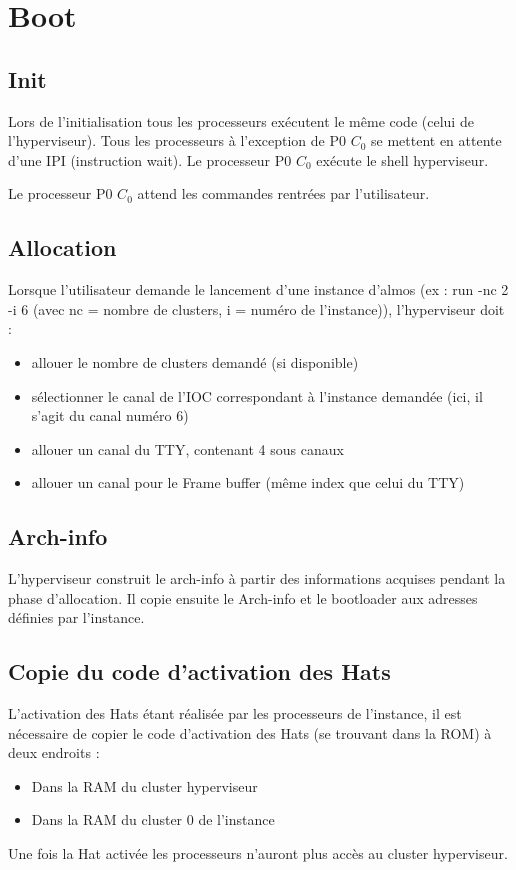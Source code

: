 \documentclass[8pt]{article}
\begin{document}
\section*{Boot}
\subsection*{Init}
Lors de l'initialisation tous les processeurs exécutent le même code (celui de l'hyperviseur). Tous les processeurs à l'exception de P0 $C_0$ se mettent en attente d'une IPI (instruction wait). Le processeur P0 $C_0$ exécute le shell hyperviseur.

Le processeur P0 $C_0$ attend les commandes rentrées par l'utilisateur.

\subsection*{Allocation}
Lorsque l'utilisateur demande le lancement d'une instance d'almos (ex : run -nc 2 -i 6 (avec nc = nombre de clusters, i = numéro de l'instance)), l'hyperviseur doit :
\begin{itemize}
        \item allouer le nombre de clusters demandé (si disponible)
        \item sélectionner le canal de l'IOC correspondant à l'instance demandée (ici, il s'agit du canal numéro 6)
        \item allouer un canal du TTY, contenant 4 sous canaux
        \item allouer un canal pour le Frame buffer (même index que celui du TTY)
\end{itemize}

\subsection*{Arch-info}

L'hyperviseur construit le arch-info à partir des informations acquises pendant la phase d'allocation.
Il copie ensuite le Arch-info et le bootloader aux adresses définies par l'instance. 

\subsection*{Copie du code d'activation des Hats}

L'activation des Hats étant réalisée par les processeurs de l'instance, il est nécessaire de copier le code d'activation des Hats (se trouvant dans la ROM) à deux endroits :
\begin{itemize}
        \item Dans la RAM du cluster hyperviseur
        \item Dans la RAM du cluster 0 de l'instance
\end{itemize}
Une fois la Hat activée les processeurs n'auront plus accès au cluster hyperviseur.
\end{document}
